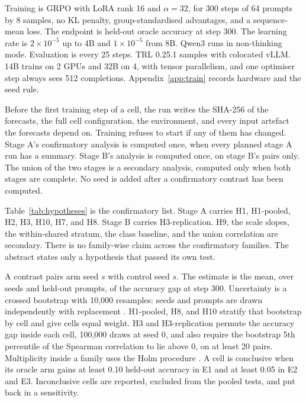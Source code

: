 Training is GRPO \citep{shao2024deepseekmath} with LoRA rank 16 and $\alpha = 32$, for 300 steps of 64 prompts by 8 samples, no KL penalty, group-standardised advantages, and a sequence-mean loss.
The endpoint is held-out oracle accuracy at step 300.
The learning rate is $2 \times 10^{-5}$ up to 4B and $1 \times 10^{-5}$ from 8B.
Qwen3 runs in non-thinking mode.
Evaluation is every 25 steps.
TRL 0.25.1 samples with colocated vLLM.
14B trains on 2 GPUs and 32B on 4, with tensor parallelism, and one optimiser step always sees 512 completions.
Appendix~\ref{app:train} records hardware and the seed rule.

Before the first training step of a cell, the run writes the SHA-256 of the forecasts, the full cell configuration, the environment, and every input artefact the forecasts depend on.
Training refuses to start if any of them has changed.
Stage A's confirmatory analysis is computed once, when every planned stage A run has a summary.
Stage B's analysis is computed once, on stage B's pairs only.
The union of the two stages is a secondary analysis, computed only when both stages are complete.
No seed is added after a confirmatory contrast has been computed.

Table~\ref{tab:hypotheses} is the confirmatory list.
Stage A carries H1, H1-pooled, H2, H3, H10, H7, and H8.
Stage B carries H3-replication.
H9, the scale slopes, the within-shared stratum, the class baseline, and the union correlation are secondary.
There is no family-wise claim across the confirmatory families.
The abstract states only a hypothesis that passed its own test.

\begin{table}[t]
\caption{Confirmatory tests. Each family is tested at $\alpha = 0.05$. H1 rejects if at least one of its Holm-adjusted contrasts rejects and every completed seed of that contrast is positive.}
\label{tab:hypotheses}
\centering
\small
\setlength{\tabcolsep}{3pt}

\end{table}

A contrast pairs arm seed $s$ with control seed $s$.
The estimate is the mean, over seeds and held-out prompts, of the accuracy gap at step 300.
Uncertainty is a crossed bootstrap with 10,000 resamples: seeds and prompts are drawn independently with replacement \citep{owen2007pigeonhole}.
H1-pooled, H8, and H10 stratify that bootstrap by cell and give cells equal weight.
H3 and H3-replication permute the accuracy gap inside each cell, 100,000 draws at seed 0, and also require the bootstrap 5th percentile of the Spearman correlation to lie above 0, on at least 20 pairs.
Multiplicity inside a family uses the Holm procedure \citep{holm1979simple}.
A cell is conclusive when its oracle arm gains at least 0.10 held-out accuracy in E1 and at least 0.05 in E2 and E3.
Inconclusive cells are reported, excluded from the pooled tests, and put back in a sensitivity.

